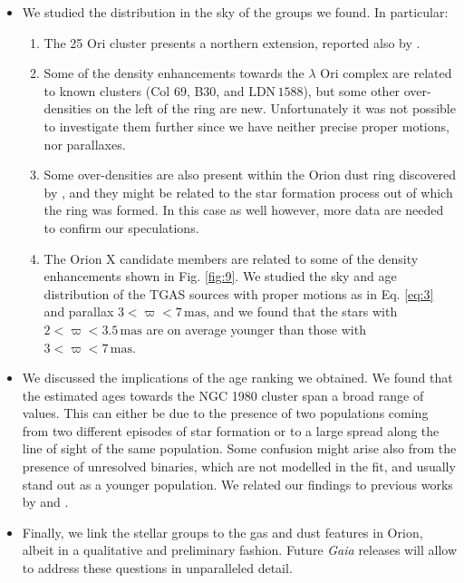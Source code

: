\documentclass[onecolumn]{aa} %
\begin{document}
\begin{itemize}
\item We studied the distribution in the sky of the groups we found. In particular:
\begin{enumerate}
\item The 25 Ori cluster presents a northern extension, reported also by \cite{Lombardi2017}.
\item Some of the density enhancements towards the $\lambda$ Ori complex are related to known clusters (Col 69, B30, and $\mathrm{LDN \, 1588}$), but some other over-densities on the left of the ring are new. Unfortunately it was not possible to investigate them further since we  have neither precise proper motions, nor parallaxes.
\item Some over-densities are also present within the Orion dust ring discovered by \cite{Schlafly2015}, and they might be related to the star formation process out of which the ring was formed. In this case as well however, more data are needed to confirm our speculations.
\item The Orion X candidate members \citep{Bouy2015} are related to some of the density enhancements shown in Fig. \ref{fig:9}. We studied the sky and age distribution of the TGAS sources with proper motions as in Eq. \eqref{eq:3} and parallax $3 < \varpi < 7 \, \mathrm{mas}$, and we found that the stars with $2 < \varpi < 3.5 \, \mathrm{mas}$ are on average younger than those with $3 < \varpi < 7 \, \mathrm{mas}$.
\end{enumerate}

\item We discussed the implications of the age ranking we obtained. 
We found that the estimated ages towards the NGC 1980 cluster span a broad range of values. This can either be due to the presence of two populations coming from two different episodes of star formation or to a large spread along the line of sight of the same population. Some confusion might arise also from the presence of unresolved binaries, which are not modelled in the fit, and usually stand out as a younger population. We related our findings to previous works by \cite{Bouy2014, DaRio2016} and \cite{Fang2017}. 
\item  Finally, we link the stellar groups to the gas and dust features in Orion, albeit in a qualitative and preliminary fashion. Future \textit{Gaia} releases will allow to address these questions in unparalleled detail.
\end{itemize}
\end{document}
